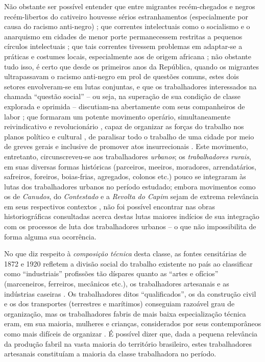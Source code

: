 Não obstante ser possível entender que entre migrantes recém-chegados e negros recém-libertos do cativeiro houvesse sérios estranhamentos (especialmente por causa do racismo anti-negro) \cite[pp.~35-76]{chalhoub_botequim_1986}; que correntes intelectuais como o socialismo e o anarquismo em cidades de menor porte permanecessem restritas a pequenos círculos intelectuais \cite{duarte_rebelde_1991}; que tais correntes tivessem problemas em adaptar-se a práticas e costumes locais, especialmente aos de origem africana \cite{goes_formacao_1988}; não obstante tudo isso, é certo que desde os primeiros anos da República, quando os migrantes ultrapassavam o racismo anti-negro em prol de questões comuns, estes dois setores envolveram-se em lutas conjuntas, e que os trabalhadores interessados na chamada ``questão social'' -- ou seja, na superação de sua condição de classe explorada e oprimida -- discutiam-na abertamente com seus companheiros de labor \cite[p.~73-85]{gomes_velhos_1988}; que formaram um potente movimento operário, simultaneamente reivindicativo e revolucionário \cite{samis_anabras_2004}, capaz de organizar as forças do trabalho nos planos político e cultural \cite{farinha_federa_2002,hardman_patripatr_2002}, de paralisar todo o trabalho de uma cidade por meio de greves gerais \cite{castellucci_salvador_2001,magnani_anarsp_1982} e inclusive de promover atos insurrecionais \cite{dulles_anacombras_1977,koval_prolbras_1982}. Este movimento, entretanto, circunscreveu-se aos trabalhadores \textit{urbanos}; os \textit{trabalhadores rurais}, em suas diversas formas históricas (parceiros, meeiros, moradores, arrendatários, safreiros, foreiros, boias-frias, agregados, colonos etc.) pouco se integraram às lutas dos trabalhadores urbanos no período estudado; embora movimentos como os de \textit{Canudos}, do \textit{Contestado} e a \textit{Revolta do Capim} sejam de extrema relevância em seus respectivos contextos \cite{mottazarth_rescamp1_2008}, não foi possível encontrar nas obras historiográficas consultadas acerca destas lutas maiores indícios de sua integração com os processos de luta dos trabalhadores urbanos -- o que não impossibilita de forma alguma sua ocorrência. 

No que diz respeito à \textit{composição técnica} desta classe, as fontes censitárias de 1872 e 1920 refletem a divisão social do trabalho existente no país ao classificar como ``industriais'' profissões tão díspares quanto as ``artes e ofícios'' (marceneiros, ferreiros, mecânicos etc.), os trabalhadores artesanais e as indústrias caseiras \cite[p.~141]{pinheiro_prolind_1977}. Os trabalhadores ditos ``qualificados'', os da construção civil e os dos transportes (terrestres e marítimos) conseguiam razoável grau de organização, mas os trabalhadores fabris de mais baixa especialização técnica eram, em sua maioria, mulheres e crianças, considerados por seus contemporâneos como mais difíceis de organizar \cite[p.~152]{pinheiro_prolind_1977}. É possível dizer que, dada a pequena relevância da produção fabril na vasta maioria do território brasileiro, estes trabalhadores artesanais constituíam a maioria da classe trabalhadora no período.

